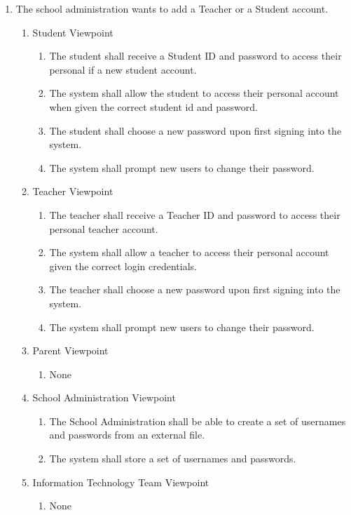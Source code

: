 \documentclass[]{article}
\begin{document}
\begin{enumerate}[{BE}1.]
	\item The school administration wants to add a Teacher or a Student account.
	\begin{enumerate}[{VP1}.1]
		\item Student Viewpoint
			\begin{enumerate}
				\item The student shall receive a Student ID and password to access their
personal if a new student account.
				\item The system shall allow the student to access their personal account 
when given the correct student id and password.
				\item The student shall choose a new password upon first signing into the
system.
				\item The system shall prompt new users to change their password.
			\end{enumerate}
		\item Teacher Viewpoint
			\begin{enumerate}
				\item The teacher shall receive a Teacher ID and password to access their
personal teacher account.
				\item The system shall allow a teacher to access their personal account 
given the correct login credentials.
				\item The teacher shall choose a new password upon first signing into the
system.
				\item The system shall prompt new users to change their password.
			\end{enumerate}
		\item Parent Viewpoint
			\begin{enumerate}
				\item None
			\end{enumerate}
		\item School Administration Viewpoint
			\begin{enumerate}
				\item The School Administration shall be able to create a set of usernames
and passwords from an external file.
				\item The system shall store a set of usernames and passwords.
			\end{enumerate}
		\item Information Technology Team Viewpoint
			\begin{enumerate}
				\item None
			\end{enumerate}

\end{enumerate}
\end{enumerate}
\end{document}

